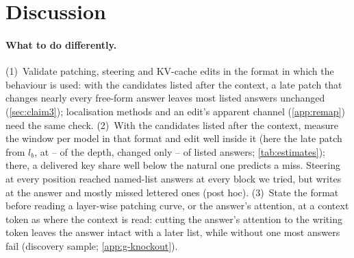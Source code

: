 \section{Discussion}\label{sec:discussion}

\paragraph{What to do differently.}
(1)~Validate patching, steering and KV-cache edits in the format in which the behaviour is used: with the candidates listed after the context, a late patch that changes nearly every free-form answer leaves most listed answers unchanged (\cref{sec:claim3}); localisation methods \citep{mueller2025mib} and an edit's apparent channel (\cref{app:remap}) need the same check.
(2)~With the candidates listed after the context, measure the window per model in that format and edit well inside it (here the late patch from $l_b$, at \NqLbFracMin--\NqLbFracMax{} of the depth, changed only \NqLateListedMin--\NqLateListedMax{} of listed answers; \cref{tab:estimates}); there, a delivered key share well below the natural one predicts a miss. Steering at every position reached named-list answers at every block we tried, but writes at the answer and mostly missed lettered ones (post hoc).
(3)~State the format before reading a layer-wise patching curve, or the answer's attention, at a context token as where the context is read: cutting the answer's attention to the writing token leaves the answer intact with a later list, while without one most answers fail (discovery sample; \cref{app:g-knockout}).

